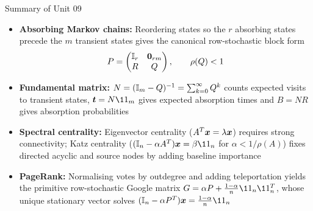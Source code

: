 \documentclass[aspectratio=169]{beamer}\usepackage[]{graphicx}\usepackage[]{xcolor}
\providecommand{\bt}{\bm{t}}
\begin{document}
\begin{frame}{Summary of Unit 09}
\begin{itemize}
\item \textbf{Absorbing Markov chains:} Reordering states so the $r$ absorbing states precede the $m$ transient states gives the canonical row-stochastic block form
\[
P = \begin{pmatrix} \II_r & \b0_{rm} \\ R & Q \end{pmatrix}, \qquad \rho(Q) < 1
\]
\item \textbf{Fundamental matrix:} $N = (\mathbb{I}_m - Q)^{-1} = \sum_{k=0}^\infty Q^k$ counts expected visits to transient states, $\bt = N\11_m$ gives expected absorption times and $B = N R$ gives absorption probabilities
\item \textbf{Spectral centrality:} Eigenvector centrality ($A^T\bm{x} = \lambda\bm{x}$) requires strong connectivity; Katz centrality ($(\II_n - \alpha A^T)\bx = \beta\11_n$ for $\alpha < 1/\rho(A)$) fixes directed acyclic and source nodes by adding baseline importance
\item \textbf{PageRank:} Normalising votes by outdegree and adding teleportation yields the primitive row-stochastic Google matrix $G = \alpha P + \frac{1-\alpha}{n}\11_n\11_n^T$, whose unique stationary vector solves $(\II_n - \alpha P^T)\bx = \frac{1-\alpha}{n}\11_n$
\end{itemize}
\end{frame}
\end{document}
